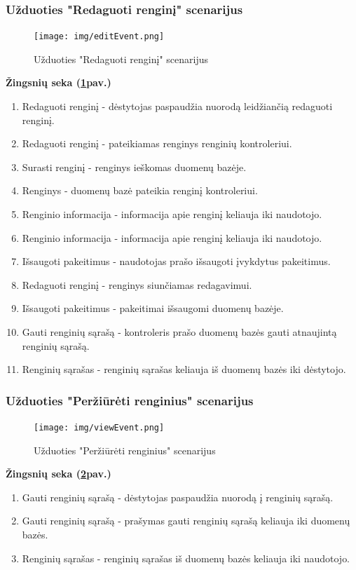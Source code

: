 \documentclass{VUMIFPSkursinis}
\begin{document}
\subsubsection{Užduoties "Redaguoti renginį" scenarijus}
\begin{figure}[H]
	\centering
	\texttt{[image: img/editEvent.png]}
	\caption{Užduoties "Redaguoti renginį" scenarijus}
	\label{fig:editEvent}
\end{figure}
\textbf{Žingsnių seka (\ref{fig:editEvent}pav.)}\\
\begin{enumerate}
	\item Redaguoti renginį - dėstytojas paspaudžia nuorodą leidžiančią redaguoti renginį.
	\item Redaguoti renginį - pateikiamas renginys renginių kontroleriui.
	\item Surasti renginį - renginys ieškomas duomenų bazėje.
	\item Renginys - duomenų bazė pateikia renginį kontroleriui.
	\item Renginio informacija -  informacija apie renginį keliauja iki naudotojo.
	\item Renginio informacija - informacija apie renginį keliauja iki naudotojo.
	\item Išsaugoti pakeitimus - naudotojas prašo išsaugoti įvykdytus pakeitimus.
	\item Redaguoti renginį - renginys siunčiamas redagavimui.
	\item Išsaugoti pakeitimus - pakeitimai išsaugomi duomenų bazėje.
	\item Gauti renginių sąrašą - kontroleris prašo duomenų bazės gauti atnaujintą renginių sąrašą.
	\item Renginių sąrašas - renginių sąrašas keliauja iš duomenų bazės iki dėstytojo.
\end{enumerate}
\subsubsection{Užduoties "Peržiūrėti renginius" scenarijus}
\begin{figure}[H]
	\centering
	\texttt{[image: img/viewEvent.png]}
	\caption{Užduoties "Peržiūrėti renginius" scenarijus}
	\label{fig:viewEvent}
\end{figure}
\textbf{Žingsnių seka (\ref{fig:viewEvent}pav.)}\\
\begin{enumerate}
	\item Gauti renginių sąrašą - dėstytojas paspaudžia nuorodą į renginių sąrašą.
	\item Gauti renginių sąrašą - prašymas gauti renginių sąrašą keliauja iki duomenų bazės.
	\item Renginių sąrašas - renginių sąrašas iš duomenų bazės keliauja iki naudotojo.
\end{enumerate}
\end{document}
